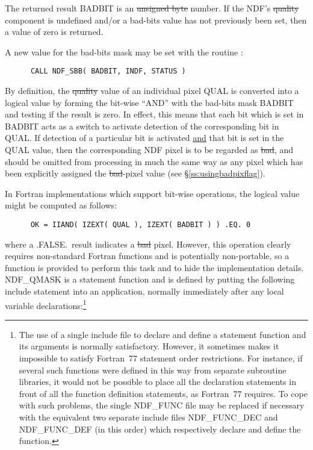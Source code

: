 The returned result BADBIT is an \st{unsigned byte\/} number.
If the NDF's \st{quality\/} component is undefined and/or a bad-bits value has
not previously been set, then a value of zero is returned. 

A new value for the bad-bits mask may be set with the routine :

\small
\begin{verbatim}
      CALL NDF_SBB( BADBIT, INDF, STATUS )
\end{verbatim}
\normalsize

By definition, the \st{quality\/} value of an individual pixel QUAL is
converted into a logical value by forming the bit-wise ``AND'' with the
bad-bits mask BADBIT and testing if the result is zero. 
In effect, this means that each bit which is set in BADBIT acts as a switch to
activate detection of the corresponding bit in QUAL.
If detection of a particular bit is activated \underline{and} that bit is
set in the QUAL value, then the corresponding NDF pixel is to be regarded as
\st{bad}, and should be omitted from processing in much the same way as any
pixel which has been explicitly assigned the \st{bad\/}-pixel value (see 
\S\ref{ss:usingbadpixflag}). 

In Fortran implementations which support bit-wise operations, the
logical value might be computed as follows:

\small
\begin{verbatim}
      OK = IIAND( IZEXT( QUAL ), IZEXT( BADBIT ) ) .EQ. 0
\end{verbatim}
\normalsize

where a .FALSE.\ result indicates a \st{bad\/} pixel.
However, this operation clearly requires non-standard Fortran
functions and is potentially non-portable, so a function  is
provided to perform this task and to hide the implementation details.
NDF\_QMASK is a statement function and is defined by putting the following
include statement into an application, normally immediately after any local
variable declarations:\footnote{The use of a single include file to declare
and define a statement function and its arguments is normally satisfactory. 
However, it sometimes makes it impossible to satisfy Fortran~77 statement
order restrictions. 
For instance, if several such functions were defined in this way from
separate subroutine libraries, it would not be possible to place all the
declaration statements in front of all the function definition statements,
as Fortran~77 requires. 
To cope with such problems, the single NDF\_FUNC file may be replaced if 
necessary with the equivalent two separate include files NDF\_FUNC\_DEC and
NDF\_FUNC\_DEF (in this order) which respectively declare and define the
function.}

